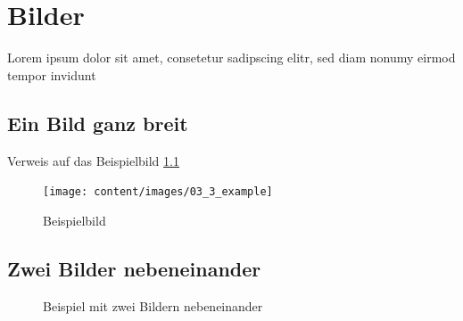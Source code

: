 
\chapter{Bilder}

Lorem ipsum dolor sit amet, consetetur sadipscing elitr, sed diam nonumy eirmod tempor invidunt 
\section{Ein Bild ganz breit} 
Verweis auf das Beispielbild \ref{fig:example}

\begin{figure}[htbp]
 \centering
 \texttt{[image: content/images/03\_3\_example]}
 \caption{Beispielbild}
 \label{fig:example}
\end{figure}

\section{Zwei Bilder nebeneinander} 

\begin{figure}
\hfill
{}
\caption{Beispiel mit zwei Bildern nebeneinander}
\end{figure}
